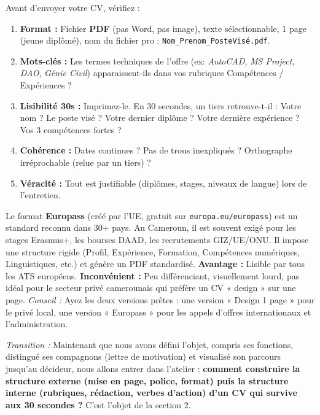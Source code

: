\documentclass[11pt]{article}
\begin{document}
\begin{methode}
Avant d'envoyer votre CV, vérifiez :
\begin{enumerate}
    \item \textbf{Format :} Fichier \textbf{PDF} (pas Word, pas image), texte sélectionnable, 1 page (jeune diplômé), nom du fichier pro : \texttt{Nom\_Prenom\_PosteVisé.pdf}.
    \item \textbf{Mots-clés :} Les termes techniques de l'offre (ex: \emph{AutoCAD}, \emph{MS Project}, \emph{DAO}, \emph{Génie Civil}) apparaissent-ils dans vos rubriques Compétences / Expériences ?
    \item \textbf{Lisibilité 30s :} Imprimez-le. En 30 secondes, un tiers retrouve-t-il : Votre nom ? Le poste visé ? Votre dernier diplôme ? Votre dernière expérience ? Vos 3 compétences fortes ?
    \item \textbf{Cohérence :} Dates continues ? Pas de trous inexpliqués ? Orthographe irréprochable (relue par un tiers) ?
    \item \textbf{Véracité :} Tout est justifiable (diplômes, stages, niveaux de langue) lors de l'entretien.
\end{enumerate}
\end{methode}

\begin{savaistu}
Le format \textbf{Europass} (créé par l'UE, gratuit sur \texttt{europa.eu/europass}) est un standard reconnu dans 30+ pays. Au Cameroun, il est souvent exigé pour les stages Erasmus+, les bourses DAAD, les recrutements GIZ/UE/ONU. Il impose une structure rigide (Profil, Expérience, Formation, Compétences numériques, Linguistiques, etc.) et génère un PDF standardisé. \textbf{Avantage :} Lisible par tous les ATS européens. \textbf{Inconvénient :} Peu différenciant, visuellement lourd, pas idéal pour le secteur privé camerounais qui préfère un CV « design » sur une page. \emph{Conseil :} Ayez les deux versions prêtes : une version « Design 1 page » pour le privé local, une version « Europass » pour les appels d'offres internationaux et l'administration.
\end{savaistu}

\noindent
\emph{Transition :} Maintenant que nous avons défini l'objet, compris ses fonctions, distingué ses compagnons (lettre de motivation) et visualisé son parcours jusqu'au décideur, nous allons entrer dans l'atelier : \textbf{comment construire la structure externe (mise en page, police, format) puis la structure interne (rubriques, rédaction, verbes d'action) d'un CV qui survive aux 30 secondes ?} C'est l'objet de la section 2.
\end{document}
